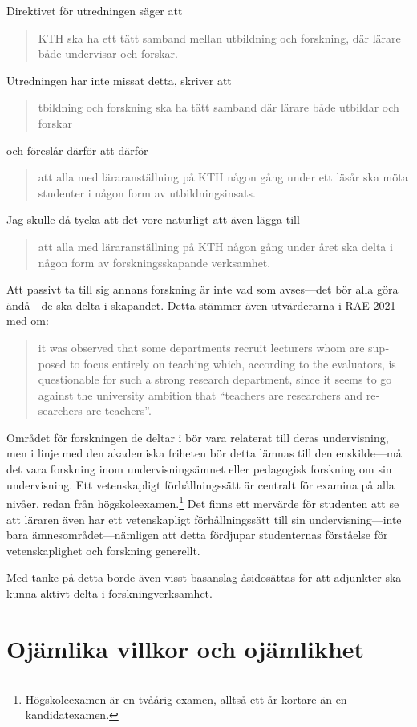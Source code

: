 \documentclass[a4paper,oneside,article,swedish]{memoir}
\let\section\chapter
\begin{document}
Direktivet för utredningen säger att
\blockcquote[s.~1]{direktiv}{%
  KTH ska ha ett tätt samband mellan utbildning och forskning, där lärare både 
  undervisar och forskar.%
}
Utredningen har inte missat detta, \textcite{utredning} skriver att
\blockcquote[s.~2]{utredning}{%
  tbildning och forskning ska ha tätt samband där lärare både 
  utbildar och forskar%
}
och föreslår därför att därför
\blockcquote[s-~2]{utredning}{%
  att alla med läraranställning på KTH någon gång under ett läsår ska möta 
  studenter i någon form av utbildningsinsats.%
}

Jag skulle då tycka att det vore naturligt att även lägga till
\blockquote{%
  att alla med läraranställning på KTH någon gång under året ska delta i någon 
  form av forskningsskapande verksamhet.%
}
Att passivt ta till sig annans forskning är inte vad som avses---det bör alla 
göra ändå---de ska delta i skapandet.
Detta stämmer även utvärderarna i RAE 2021 med om:
\blockcquote[s.~19]{RAE2021}{\foreignlanguage{english}{%
  it was observed
  that some departments recruit lecturers whom are supposed
  to focus entirely on teaching which, according to the evaluators, is 
  questionable for such a strong research department,
  since it seems to go against the university ambition that
  \enquote{teachers are researchers and researchers are teachers}.%
}}
Området för forskningen de deltar i bör vara relaterat till deras undervisning, 
men i linje med den akademiska friheten bör detta lämnas till den enskilde---må 
det vara forskning inom undervisningsämnet eller pedagogisk forskning om sin 
undervisning.
Ett vetenskapligt förhållningssätt är centralt för examina på alla nivåer, 
redan från högskoleexamen.\footnote{%
  Högskoleexamen är en tvåårig examen, alltså ett år kortare än en 
  kandidatexamen.
}\autocite[bilaga 2]{Högskoleförordningen}
Det finns ett mervärde för studenten att se att läraren även har ett 
vetenskapligt förhållningssätt till sin undervisning---inte bara 
ämnesområdet---nämligen att detta fördjupar studenternas förståelse för 
vetenskaplighet och forskning generellt\autocite{NCOL}.

Med tanke på detta borde även visst basanslag åsidosättas för att adjunkter ska 
kunna aktivt delta i forskningverksamhet.


\section{Ojämlika villkor och 
ojämlikhet}\label{ForskandeAdjunkter}\label{OjämlikaVillkor}
\end{document}
